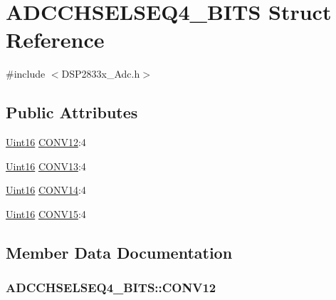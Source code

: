 \hypertarget{struct_a_d_c_c_h_s_e_l_s_e_q4___b_i_t_s}{}\section{A\+D\+C\+C\+H\+S\+E\+L\+S\+E\+Q4\+\_\+\+B\+I\+T\+S Struct Reference}
\label{struct_a_d_c_c_h_s_e_l_s_e_q4___b_i_t_s}


{\ttfamily \#include $<$D\+S\+P2833x\+\_\+\+Adc.\+h$>$}

\subsection*{Public Attributes}
\begin{DoxyCompactItemize}
\item 
\hyperlink{_d_s_p2833x___device_8h_a59a9f6be4562c327cbfb4f7e8e18f08b}{Uint16} \hyperlink{struct_a_d_c_c_h_s_e_l_s_e_q4___b_i_t_s_af47b46a7b2670b2a4171ace7d3971636}{C\+O\+N\+V12}\+:4
\item 
\hyperlink{_d_s_p2833x___device_8h_a59a9f6be4562c327cbfb4f7e8e18f08b}{Uint16} \hyperlink{struct_a_d_c_c_h_s_e_l_s_e_q4___b_i_t_s_afedeed7769b05e5d78d9041d2e142af8}{C\+O\+N\+V13}\+:4
\item 
\hyperlink{_d_s_p2833x___device_8h_a59a9f6be4562c327cbfb4f7e8e18f08b}{Uint16} \hyperlink{struct_a_d_c_c_h_s_e_l_s_e_q4___b_i_t_s_a5bda8686af6fa5b3828ef26a5581c799}{C\+O\+N\+V14}\+:4
\item 
\hyperlink{_d_s_p2833x___device_8h_a59a9f6be4562c327cbfb4f7e8e18f08b}{Uint16} \hyperlink{struct_a_d_c_c_h_s_e_l_s_e_q4___b_i_t_s_af9b7662effab51406dd650aecc7257d7}{C\+O\+N\+V15}\+:4
\end{DoxyCompactItemize}


\subsection{Member Data Documentation}
\hypertarget{struct_a_d_c_c_h_s_e_l_s_e_q4___b_i_t_s_af47b46a7b2670b2a4171ace7d3971636}{}
\subsubsection[{C\+O\+N\+V12}]{ A\+D\+C\+C\+H\+S\+E\+L\+S\+E\+Q4\+\_\+\+B\+I\+T\+S\+::\+C\+O\+N\+V12}\label{struct_a_d_c_c_h_s_e_l_s_e_q4___b_i_t_s_af47b46a7b2670b2a4171ace7d3971636}
\hypertarget{struct_a_d_c_c_h_s_e_l_s_e_q4___b_i_t_s_afedeed7769b05e5d78d9041d2e142af8}{}

